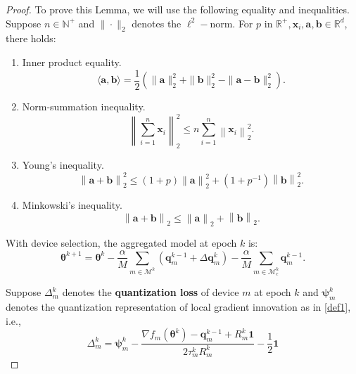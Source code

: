\documentclass[lettersize,journal]{IEEEtran}
\begin{document}
\begin{proof}
To prove this Lemma, we will use the following equality and inequalities.
Suppose $n \in \mathbb{N}^+$ and $\| \cdot \|_2$ denotes the $\ell^2-$norm. For $p$ in $\mathbb{R}^{+}, \boldsymbol{x}_i, \boldsymbol{a}, \boldsymbol{b} \in \mathbb{R}^d$, there holds:
\begin{enumerate}
    \item Inner product equality.
    \begin{equation}
    \langle\boldsymbol{a}, \boldsymbol{b}\rangle=\frac{1}{2}\left(\|\boldsymbol{a}\|_2^2+\|\boldsymbol{b}\|_2^2-\|\boldsymbol{a}-\boldsymbol{b}\|_2^2\right).
    \label{inner_pro}
    \end{equation}
    \item Norm-summation inequality.
    \begin{equation}
        \left\|\sum_{i = 1}^{n} \boldsymbol{x}_i \right\|_2^2 \leqslant n \sum_{i=1}^{n} \left\| \boldsymbol{x}_i\right\|_2^2.
        \label{sum_ineq}
    \end{equation}
    \item Young's inequality.
    \begin{equation}
        \left\| \boldsymbol{a} + \boldsymbol{b} \right\|_2^2 \leqslant (1 + p)\left\| \boldsymbol{a} \right\|_2^2 + (1 + p^{-1})\left\| \boldsymbol{b} \right\|_2^2.
        \label{youngs}
    \end{equation}
    
    \item Minkowski’s inequality.
    \begin{equation}
        \left\| \boldsymbol{a} + \boldsymbol{b} \right\|_2 \leqslant \left\| \boldsymbol{a} \right\|_2 + \left\| \boldsymbol{b} \right\|_2.
        \label{Minko}
    \end{equation}
\end{enumerate}

With device selection, the aggregated model at epoch $k$ is:
\begin{equation}
\boldsymbol{\theta} ^{k+1} = \boldsymbol{\theta} ^{k}- \frac{\alpha}{M}\sum_{m \in \mathcal{M}^k }\left(\boldsymbol{q}_{m}^{k-1}+ \Delta \boldsymbol{q}_{m}^{k} \right)- \frac{\alpha}{M} \sum_{m \in \mathcal{M}_{c}^{k}}\boldsymbol{q}_{m}^{k-1}.
\label{appendix2}
\end{equation}

Suppose $\Delta_m^k$ denotes the \textbf{quantization loss} of device $m$ at epoch $k$ and $\boldsymbol{\psi}_{m}^{k}$ denotes the quantization representation of local gradient innovation as in \cref{def1}, i.e.,
\begin{equation}
\Delta_m^k=
\boldsymbol{\psi}_{m}^{k}-\frac{\nabla f_m\left(\boldsymbol{\theta}^k\right)-\boldsymbol{q}_{m}^{k-1}+R_m^k\boldsymbol{1}}{2 \tau_m^k R_m^k}-\frac{1}{2}\boldsymbol{1}
\label{def_Delta}
\end{equation}


\end{proof}
\end{document}

